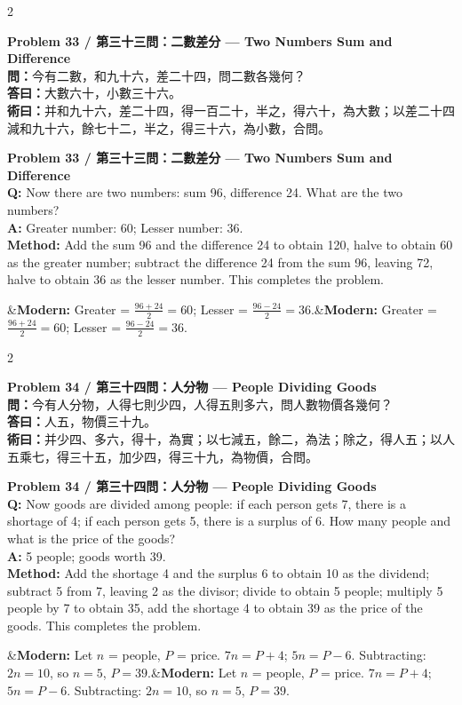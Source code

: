 \documentclass[11pt,a4paper]{article}
\newcommand{\bilingualproblem}[4]{%
  \begin{paracol}{2}
  \begin{leftcolumn}
  \noindent\textbf{\color{problemcolor}#1}\\[0.2cm]
  #2
  \end{leftcolumn}
  \switchcolumn
  \noindent\textbf{\color{problemcolor}#1}\\[0.2cm]
  #3
  \end{paracol}
  \ifx&#4&\else\vspace{0.3cm}\noindent#4\fi
  \vspace{0.5cm}
}
\newcommand{\wen}[1]{\textcolor{problemcolor}{\textbf{問：}}#1}
\newcommand{\da}[1]{\textcolor{answercolor}{\textbf{答曰：}}#1}
\newcommand{\shu}[1]{\textcolor{methodcolor}{\textbf{術曰：}}#1}
\newcommand{\wenen}[1]{\textcolor{problemcolor}{\textbf{Q:}} #1}
\newcommand{\daen}[1]{\textcolor{answercolor}{\textbf{A:}} #1}
\newcommand{\shuen}[1]{\textcolor{methodcolor}{\textbf{Method:}} #1}
\begin{document}
\bilingualproblem{Problem 33 / 第三十三問：二數差分 --- Two Numbers Sum and Difference}{
\wen{今有二數，和九十六，差二十四，問二數各幾何？}\\[0.2cm]
\da{大數六十，小數三十六。}\\[0.2cm]
\shu{并和九十六，差二十四，得一百二十，半之，得六十，為大數；以差二十四減和九十六，餘七十二，半之，得三十六，為小數，合問。}
}{
\wenen{Now there are two numbers: sum 96, difference 24. What are the two numbers?}\\[0.2cm]
\daen{Greater number: 60; Lesser number: 36.}\\[0.2cm]
\shuen{Add the sum 96 and the difference 24 to obtain 120, halve to obtain 60 as the greater number; subtract the difference 24 from the sum 96, leaving 72, halve to obtain 36 as the lesser number. This completes the problem.}
}{\textbf{Modern:} Greater = $\frac{96+24}{2} = 60$; Lesser = $\frac{96-24}{2} = 36$.}

\bilingualproblem{Problem 34 / 第三十四問：人分物 --- People Dividing Goods}{
\wen{今有人分物，人得七則少四，人得五則多六，問人數物價各幾何？}\\[0.2cm]
\da{人五，物價三十九。}\\[0.2cm]
\shu{并少四、多六，得十，為實；以七減五，餘二，為法；除之，得人五；以人五乘七，得三十五，加少四，得三十九，為物價，合問。}
}{
\wenen{Now goods are divided among people: if each person gets 7, there is a shortage of 4; if each person gets 5, there is a surplus of 6. How many people and what is the price of the goods?}\\[0.2cm]
\daen{5 people; goods worth 39.}\\[0.2cm]
\shuen{Add the shortage 4 and the surplus 6 to obtain 10 as the dividend; subtract 5 from 7, leaving 2 as the divisor; divide to obtain 5 people; multiply 5 people by 7 to obtain 35, add the shortage 4 to obtain 39 as the price of the goods. This completes the problem.}
}{\textbf{Modern:} Let $n$ = people, $P$ = price. $7n = P + 4$; $5n = P - 6$. Subtracting: $2n = 10$, so $n = 5$, $P = 39$.}

\newpage
\end{document}
